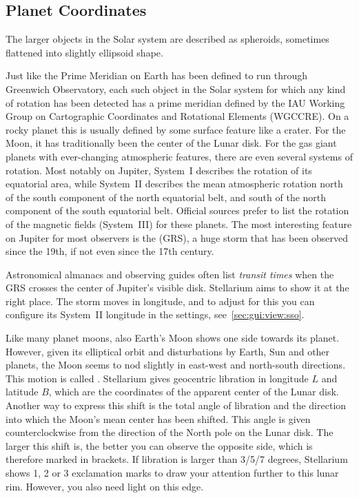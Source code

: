 \subsection{Planet Coordinates}
\label{sec:Concepts:PlanetCoordinates}

The larger objects in the Solar system are described as spheroids,
sometimes flattened into slightly ellipsoid shape.

Just like the Prime Meridian on Earth has been defined to run through
Greenwich Observatory, each such object in the Solar system for which
any kind of rotation has been detected has a prime meridian defined by
the IAU Working Group on Cartographic Coordinates and Rotational
Elements (WGCCRE). On a rocky planet this is usually defined by some
surface feature like a crater. For the Moon, it has traditionally been
the center of the Lunar disk. For the gas giant planets with
ever-changing atmospheric features, there are even several systems of
rotation. Most notably on Jupiter, System~I describes the rotation of
its equatorial area, while System~II describes the mean atmospheric
rotation north of the south component of the north equatorial belt,
and south of the north component of the south equatorial
belt. Official sources prefer to list the rotation of the magnetic
fields (System~III) for these planets. The most interesting feature on
Jupiter for most observers is the  (GRS), a
huge storm that has been observed since the 19th, if not even since
the 17th century.

Astronomical almanacs and observing guides often list \emph{transit
  times} when the GRS crosses the center of Jupiter's visible
disk. Stellarium aims to show it at the right place. The storm moves
in longitude, and to adjust for this you can configure its System~II
longitude in the settings, see~\ref{sec:gui:view:sso}.

Like many planet moons, also Earth's Moon shows one side towards its
planet. However, given its elliptical orbit and disturbations by
Earth, Sun and other planets, the Moon seems to nod slightly in
east-west and north-south directions. This motion is called
.  Stellarium gives geocentric
libration in longitude $L$ and latitude $B$, which are the coordinates
of the apparent center of the Lunar disk. Another way to express this
shift is the total angle of libration and the direction into which the
Moon's mean center has been shifted. This angle is given
counterclockwise from the direction of the North pole on the Lunar
disk. The larger this shift is, the better you can observe the
opposite side, which is therefore marked in brackets. If libration is
larger than 3/5/7 degrees, Stellarium shows 1, 2 or 3 exclamation
marks to draw your attention further to this lunar rim. However, you
also need light on this edge.

